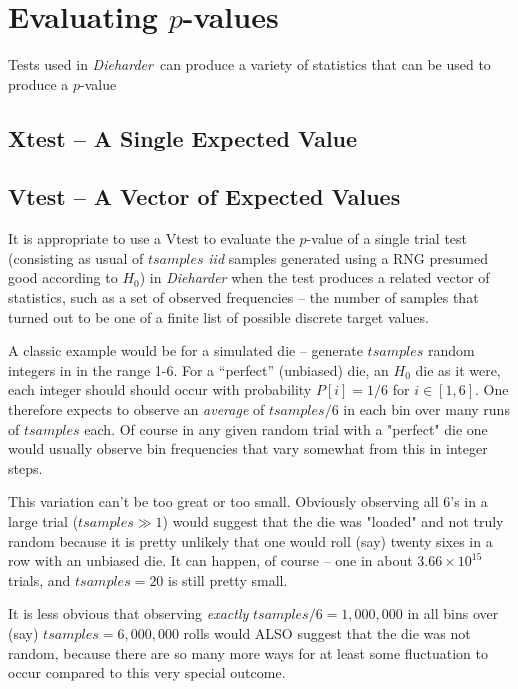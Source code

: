 \documentclass[12pt]{book}
\newcommand{\die}{\emph{Dieharder}\ }
\begin{document}
\chapter{Evaluating $p$-values}

Tests used in \die can produce a variety of statistics that can be
used to produce a $p$-value

\section{Xtest -- A Single Expected Value}

\section{Vtest -- A Vector of Expected Values}

It is appropriate to use a Vtest to evaluate the $p$-value of a single
trial test (consisting as usual of $tsamples$ {\em iid} samples
generated using a RNG presumed good according to $H_0$) in {\em
Dieharder} when the test produces a related vector of statistics, such
as a set of observed frequencies -- the number of samples that turned
out to be one of a finite list of possible discrete target values.

A classic example would be for a simulated die -- generate $tsamples$
random integers in in the range 1-6.  For a ``perfect'' (unbiased) die,
an $H_0$ die as it were, each integer should should occur with
probability $P[i] = 1/6$ for $i\in [1,6]$.  One therefore expects to
observe an {\em average} of $tsamples/6$ in each bin over many runs of
$tsamples$ each.  Of course in any given random trial with a "perfect"
die one would usually observe bin frequencies that vary somewhat from
this in integer steps.

This variation can't be too great or too small.  Obviously observing all
6's in a large trial ($tsamples \gg 1$) would suggest that the die was
"loaded" and not truly random because it is pretty unlikely that one
would roll (say) twenty sixes in a row with an unbiased die.  It can
happen, of course -- one in about $3.66\times10^{15}$ trials, and
$tsamples = 20$ is still pretty small.

It is less obvious that observing {\em exactly} $tsamples/6 = 1,000,000$
in all bins over (say) $tsamples = 6,000,000$ rolls would ALSO suggest
that the die was not random, because there are so many more ways for at
least some fluctuation to occur compared to this very special outcome.
\end{document}
